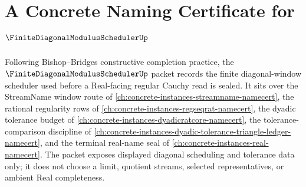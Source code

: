 \chapter{A Concrete Naming Certificate for $\FiniteDiagonalModulusSchedulerUp$}
\label{ch:concrete-instances-finite-diagonal-modulus-scheduler-namecert}

Following Bishop--Bridges constructive completion practice, the $\FiniteDiagonalModulusSchedulerUp$ packet records the finite diagonal-window scheduler used before a Real-facing regular Cauchy read is sealed. It sits over the StreamName window route of \autoref{ch:concrete-instances-streamname-namecert}, the rational regularity rows of \autoref{ch:concrete-instances-regseqrat-namecert}, the dyadic tolerance budget of \autoref{ch:concrete-instances-dyadicratcore-namecert}, the tolerance-comparison discipline of \autoref{ch:concrete-instances-dyadic-tolerance-triangle-ledger-namecert}, and the terminal real-name seal of \autoref{ch:concrete-instances-real-namecert}. The packet exposes displayed diagonal scheduling and tolerance data only; it does not choose a limit, quotient streams, selected representatives, or ambient Real completeness.

